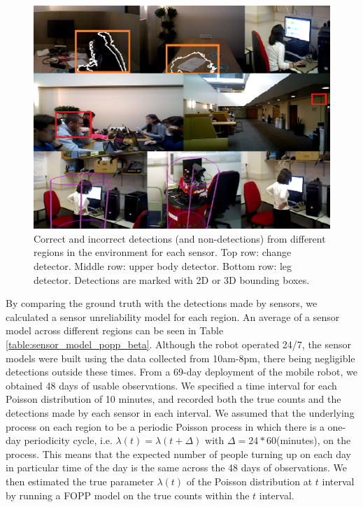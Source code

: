 \begin{figure}[t]
	\centering
	\includegraphics[width=0.95\columnwidth]{./figures/sensor_images.png}
	\caption{Correct and incorrect detections (and non-detections) from different regions in the environment for each sensor. Top row: change detector. Middle row: upper body detector. Bottom row: leg detector. Detections are marked with 2D or 3D bounding boxes.}
	\label{fig:single_sensor_rate_transformation}
\end{figure}

By comparing the ground truth with the detections made by sensors, we calculated a sensor unreliability model for each region. An average of a sensor model across different regions can be seen in Table \ref{table:sensor_model_popp_beta}. Although the robot operated 24/7, the sensor models were built using the data collected from 10am-8pm, there being negligible detections outside these times. From a 69-day deployment of the mobile robot, we obtained 48 days of usable observations. We specified a time interval for each Poisson distribution of 10 minutes, and recorded both the true counts and the detections made by each sensor in each interval. We assumed that the underlying process on each region to be a periodic Poisson process in which there is a one-day periodicity cycle, i.e. $\lambda(t) = \lambda(t + \Delta)$ with $\Delta = 24 * 60$(minutes), on the process. This means that the expected number of people turning up on each day in particular time of the day is the same across the 48 days of observations. We then estimated the true parameter $\lambda(t)$ of the Poisson distribution at $t$ interval by running a FOPP model on the true counts within the $t$ interval.

